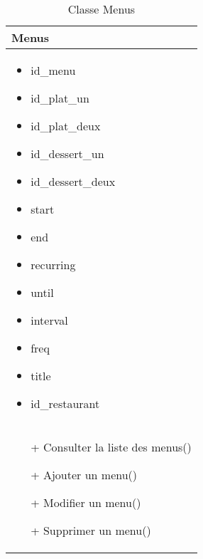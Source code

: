 \begin{table}[H]
    \begin{center}
        \begin{tabular}{|Z{5cm}|}
            \hline
            \textbf{Menus}\\
            \hline
            \begin{itemize}
                \item id\_menu
                \item id\_plat\_un
                \item id\_plat\_deux
                \item id\_dessert\_un
                \item id\_dessert\_deux
                \item start
                \item end
                \item recurring
                \item until
                \item interval
                \item freq
                \item title
                \item id\_restaurant
            \end{itemize}\\
            \hline
            \begin{itemize}
                \item[+] Consulter la liste des menus()
                \item[+] Ajouter un menu()
                \item[+] Modifier un menu()
                \item[+] Supprimer un menu()
            \end{itemize}
            \\
            \hline
        \end{tabular}	
        \caption{Classe Menus}
    \end{center}
\end{table}

